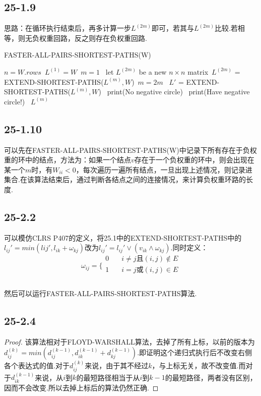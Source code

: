 \documentclass[twocolumn]{article}
\newenvironment{SChinese}{%
	\CJKfamily{gbsn}%
	\CJKtilde
	\CJKnospace}{}
\begin{document}
\begin{CJK}{UTF8}{}
\begin{SChinese}
			\subsection*{25-1.9}
				思路：在循环执行结束后，再多计算一步$L^{(2m)}$即可，若其与$L^{(2m)}$比较.若相等，则无负权重回路，反之则存在负权重回路.
				\begin{algorithm}[]
					\caption{FASTER-ALL-PAIRS-SHORTEST-PATHS(W)}
					\begin{algorithmic}[1]
						\STATE $n = W.rows$\
						\STATE $L^{(1)} = W$\
						\STATE $m = 1$\
						\STATE let $L^{(2m)}$ be a new $n\times n$ matrix\
						\STATE $L^{(2m)}$ = EXTEND-SHORTEST-PATHS($L^{(m)},W$)\
						\STATE $m = 2m$\
						\ENDWHILE
						\STATE $L'$ = EXTEND-SHORTEST-PATHS($L^{(m)},W$)\
						\STATE print(No negative circle)\
						\ELSE
						\STATE print(Have negative circle!)\
						\ENDIF
						\RETURN $L^{(m)}$
					\end{algorithmic}
				\end{algorithm}
			\subsection*{25-1.10}
				可以先在FASTER-ALL-PAIRS-SHORTEST-PATHS(W)中记录下所有存在于负权重的环中的结点，方法为：如果一个结点$v$存在于一个负权重的环中，则会出现在某一个$m$时，有$W_{ii} < 0$，每次遍历一遍所有结点，一旦出现上述情况，则记录进集合.在该算法结束后，通过判断各结点之间的连接情况，来计算负权重环路的长度.
			\subsection*{25-2.2}
				可以模仿CLRS P407的定义，将25.1中的EXTEND-SHORTEST-PATHS中的$l_{ij}' = min(l{ij}',l_{ik}+\omega_{kj})$改为$l_{ij}' = l_{ij}'\vee(v_{ik}\wedge\omega_{kj})$.同时定义：
				\begin{displaymath}
					\omega_{ij} = \{
					\begin{matrix}
					0 & \quad i\neq j\textrm{且}(i,j)\notin E \\
					1 & \quad i = j\textrm{或}(i,j)\in E\\
					\end{matrix}	
				\end{displaymath}
				\\
				然后可以运行FASTER-ALL-PAIRS-SHORTEST-PATHS算法.
			\subsection*{25-2.4}
				\begin{proof}
					该算法相对于FLOYD-WARSHALL算法，去掉了所有上标，以前的版本为$d_{ij}^{(k)} = min(d_{ij}^{(k-1)},d_{ik}^{(k-1)}+d_{kj}^{(k-1)})$.即证明这个递归式执行后不改变右侧各个表达式的值.对于$d_{ij}^{(k)}$来说，由于其不经过$k$，与上标无关，故不改变值.而对于$d_{ik}^{(k-1)}$来说，从$i$到$k$的最短路径相当于从$i$到$k-1$的最短路径，两者没有区别，因而不会改变.所以去掉上标后的算法仍然正确.
				\end{proof}

\end{SChinese}
\end{CJK}
\end{document}
